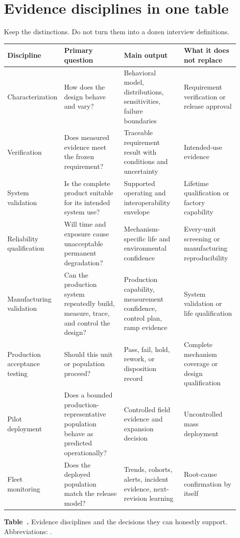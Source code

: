 \section{Evidence disciplines in one table}

Keep the distinctions. Do not turn them into a dozen interview definitions.

\begin{table}[ht]
\label{tab:validation-jobs}%
\centering
\setlength{\tabcolsep}{2.5pt}%
\footnotesize
\renewcommand{\arraystretch}{1.12}%
\begin{tabular}{@{}p{0.18\linewidth}p{0.26\linewidth}p{0.26\linewidth}p{0.24\linewidth}@{}}
\toprule
Discipline & Primary question & Main output & What it does not replace \\
\midrule
Characterization & How does the design behave and vary? & Behavioral model,
distributions, sensitivities, failure boundaries & Requirement verification or
release approval \\
\addlinespace[0.5em]
Verification & Does measured evidence meet the frozen requirement? & Traceable
requirement result with conditions and uncertainty & Intended-use evidence \\
\addlinespace[0.5em]
System validation & Is the complete product suitable for its intended system
use? & Supported operating and interoperability envelope & Lifetime
qualification or factory capability \\
\addlinespace[0.5em]
Reliability qualification & Will time and exposure cause unacceptable permanent
degradation? & Mechanism-specific life and environmental confidence & Every-unit
screening or manufacturing reproducibility \\
\addlinespace[0.5em]
Manufacturing validation & Can the production system repeatedly build, measure,
trace, and control the design? & Production capability, measurement confidence,
control plan, ramp evidence & System validation or life qualification \\
\addlinespace[0.5em]
Production acceptance testing & Should this unit or population proceed? & Pass,
fail, hold, rework, or disposition record & Complete mechanism coverage or
design qualification \\
\addlinespace[0.5em]
Pilot deployment & Does a bounded production-representative population behave as
predicted operationally? & Controlled field evidence and expansion decision &
Uncontrolled mass deployment \\
\addlinespace[0.5em]
Fleet monitoring & Does the deployed population match the release model? &
Trends, cohorts, alerts, incident evidence, next-revision learning & Root-cause
confirmation by itself \\
\bottomrule
\end{tabular}
\par\medskip
{\raggedright\footnotesize\textbf{Table~\thetable.} Evidence disciplines and
the decisions they can honestly support. Abbreviations:
.\par}
\end{table}

